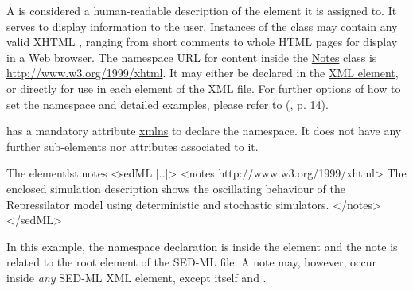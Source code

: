\label{class:notes}

A  is considered a  human-readable description of the element it is assigned to. It serves to display information to the user. 
Instances of the  class may contain any valid XHTML \citep{P+02}, ranging from short comments to whole HTML pages for display in a Web browser. 
The namespace URL for  content inside the \hyperref[class:notes]{Notes} class is \url{http://www.w3.org/1999/xhtml}. It may either be declared in the \hyperref[class:sed-ml]{ XML element}, or directly for use in each  element of the XML file. For further options of how to set the namespace and detailed examples, please refer to (\citep{HBH+10}, p. 14).

 has a mandatory attribute \hyperref[sec:xmlns]{xmlns} to declare the  namespace. It does not have any further sub-elements nor attributes associated to it.
%

%
\begin{myXmlLst}{The  element}{lst:notes}
<sedML [..]>
 <notes http://www.w3.org/1999/xhtml>
  The enclosed simulation description shows the oscillating behaviour of the Repressilator model using deterministic and stochastic simulators.
 </notes>
</sedML>
\end{myXmlLst}
%
In this example, the namespace declaration is inside the  element and the note is related to the  root element of the SED-ML file. A note may, however, occur inside \emph{any} SED-ML XML element, except  itself and \hyperref[class:annotation]{}.

